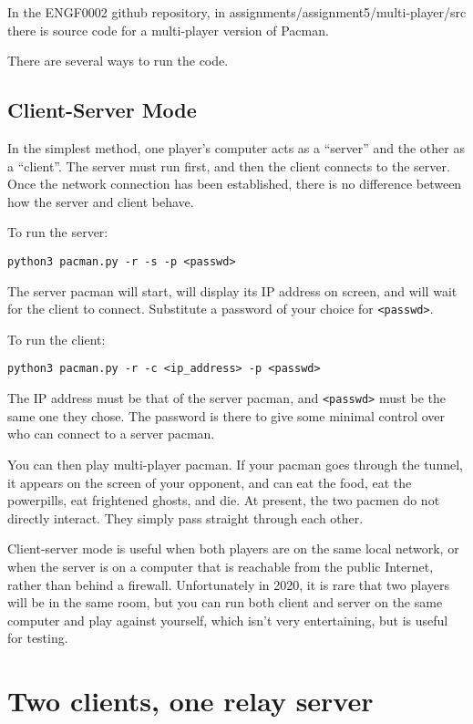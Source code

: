 \documentclass{article}
\begin{document}
In the ENGF0002 github repository, in
assignments/assignment5/multi-player/src there is source code for a
multi-player version of Pacman.

There are several ways to run the code.

\subsection*{Client-Server Mode}

In the simplest method, one
player's computer acts as a ``server'' and the other as a ``client''.
The server must run first, and then the client connects to the server.
Once the network connection has been established, there is no
difference between how the server and client behave.

To run the server:

\begin{verbatim}
python3 pacman.py -r -s -p <passwd>
\end{verbatim}

The server pacman will start, will display its IP address on screen,
and will wait for the client to connect.  Substitute a password of your choice for {\tt <passwd>}.

To run the client:

\begin{verbatim}
python3 pacman.py -r -c <ip_address> -p <passwd>
\end{verbatim}

The IP address must be that of the server pacman, and {\tt <passwd>} must be
the same one they chose.  The password is there to give some minimal
control over who can connect to a server pacman.

You can then play multi-player pacman.  If your pacman goes through
the tunnel, it appears on the screen of your opponent, and can eat the
food, eat the powerpills, eat frightened ghosts, and die.  At present,
the two pacmen do not directly interact.  They simply pass straight
through each other.

Client-server mode is useful when both players are on the same local
network, or when the server is on a computer that is reachable from
the public Internet, rather than behind a firewall.  Unfortunately in
2020, it is rare that two players will be in the same room, but you
can run both client and server on the same computer and play against
yourself, which isn't very entertaining, but is useful for testing.

\section{Two clients, one relay server}
\end{document}
